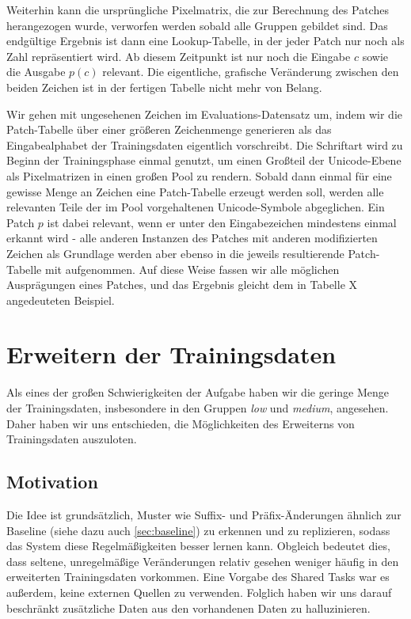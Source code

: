 \documentclass[11pt,a4paper]{article}
\begin{document}
Weiterhin kann die ursprüngliche Pixelmatrix, die zur Berechnung des Patches herangezogen wurde, verworfen werden sobald alle Gruppen gebildet sind. Das endgültige Ergebnis ist dann eine Lookup-Tabelle, in der jeder Patch nur noch als Zahl repräsentiert wird. Ab diesem Zeitpunkt ist nur noch die Eingabe $c$ sowie die Ausgabe $p(c)$ relevant. Die eigentliche, grafische Veränderung zwischen den beiden Zeichen ist in der fertigen Tabelle nicht mehr von Belang.

Wir gehen mit ungesehenen Zeichen im Evaluations-Datensatz um, indem wir die Patch-Tabelle über einer größeren Zeichenmenge generieren als das Eingabealphabet der Trainingsdaten eigentlich vorschreibt. Die Schriftart wird zu Beginn der Trainingsphase einmal genutzt, um einen Großteil der Unicode-Ebene als Pixelmatrizen in einen großen Pool zu rendern. Sobald dann einmal für eine gewisse Menge an Zeichen eine Patch-Tabelle erzeugt werden soll, werden alle relevanten Teile der im Pool vorgehaltenen Unicode-Symbole abgeglichen. Ein Patch $p$ ist dabei relevant, wenn er unter den Eingabezeichen mindestens einmal erkannt wird - alle anderen Instanzen des Patches mit anderen modifizierten Zeichen als Grundlage werden aber ebenso in die jeweils resultierende Patch-Tabelle mit aufgenommen.
Auf diese Weise fassen wir alle möglichen Ausprägungen eines Patches, und das Ergebnis gleicht dem in Tabelle X angedeuteten Beispiel. 

\section{Erweitern der Trainingsdaten}
\label{sec:enhancer}

Als eines der großen Schwierigkeiten der Aufgabe haben wir die geringe Menge der Trainingsdaten, insbesondere in den Gruppen \textit{low} und \textit{medium}, angesehen. Daher haben wir uns entschieden, die Möglichkeiten des Erweiterns von Trainingsdaten auszuloten.

\subsection{Motivation}
Die Idee ist grundsätzlich, Muster wie Suffix- und Präfix-Änderungen ähnlich zur Baseline (siehe dazu auch \autoref{sec:baseline}) zu erkennen und zu replizieren, sodass das System diese Regelmäßigkeiten besser lernen kann. Obgleich bedeutet dies, dass seltene, unregelmäßige Veränderungen relativ gesehen weniger häufig in den erweiterten Trainingsdaten vorkommen.
Eine Vorgabe des Shared Tasks war es außerdem, keine externen Quellen zu verwenden. Folglich haben wir uns darauf beschränkt zusätzliche Daten aus den vorhandenen Daten zu halluzinieren.
\end{document}
